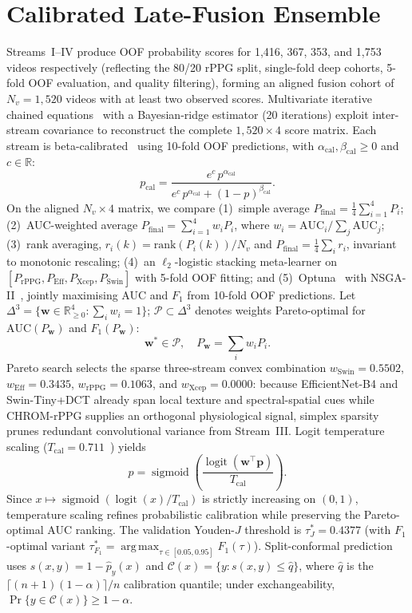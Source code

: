 \documentclass[runningheads]{llncs}
\newcommand{\R}{\mathbb{R}}
\newcommand{\bw}{\mathbf{w}}
\newcommand{\bp}{\mathbf{p}}
\newcommand{\Tcal}{T_{\mathrm{cal}}}
\DeclareMathOperator{\sigm}{sigmoid}
\DeclareMathOperator{\logit}{logit}
\DeclareMathOperator*{\argmax}{arg\,max}
\begin{document}
\section{Calibrated Late-Fusion Ensemble}
Streams~I--IV produce OOF probability scores for 1,416, 367, 353, and 1,753 videos respectively (reflecting the 80/20 rPPG split, single-fold deep cohorts, 5-fold OOF evaluation, and quality filtering), forming an aligned fusion cohort of $N_v{=}1,520$ videos with at least two observed scores. Multivariate iterative chained equations~\cite{vanbuuren2011mice} with a Bayesian-ridge estimator (20 iterations) exploit inter-stream covariance to reconstruct the complete $1,520\times 4$ score matrix. Each stream is beta-calibrated~\cite{kull2017beta} using 10-fold OOF predictions, with $\alpha_{\mathrm{cal}},\beta_{\mathrm{cal}}\ge0$ and $c\in\R$:
\begin{equation}
p_{\mathrm{cal}}=\frac{e^{c}\,p^{\alpha_{\mathrm{cal}}}}{e^{c}\,p^{\alpha_{\mathrm{cal}}}+(1-p)^{\beta_{\mathrm{cal}}}}.
\end{equation}
On the aligned $N_v\times4$ matrix, we compare (1)~simple average $P_{\mathrm{final}}=\tfrac14\sum_{i=1}^{4}P_i$; (2)~AUC-weighted average $P_{\mathrm{final}}=\sum_{i=1}^{4}w_iP_i$, where $w_i=\mathrm{AUC}_i/\sum_j\mathrm{AUC}_j$; (3)~rank averaging, $r_i(k)=\mathrm{rank}(P_i(k))/N_v$ and $P_{\mathrm{final}}=\tfrac14\sum_i r_i$, invariant to monotonic rescaling; (4)~an $\ell_2$-logistic stacking meta-learner on $[P_{\mathrm{rPPG}},P_{\mathrm{Eff}},P_{\mathrm{Xcep}},P_{\mathrm{Swin}}]$ with 5-fold OOF fitting; and (5)~Optuna~\cite{akiba2019optuna} with NSGA-II~\cite{deb2002nsga2}, jointly maximising AUC and $F_1$ from 10-fold OOF predictions. Let $\Delta^{3}=\{\bw\in\R^{4}_{\ge0}:\sum_iw_i=1\}$; $\mathcal{P}\subset\Delta^{3}$ denotes weights Pareto-optimal for $\mathrm{AUC}(P_{\bw})$ and $F_1(P_{\bw})$:
\begin{equation}
\bw^{*}\in\mathcal{P},\quad P_{\bw}=\sum_iw_iP_i.
\end{equation}
Pareto search selects the sparse three-stream convex combination $w_{\mathrm{Swin}}{=}0.5502$, $w_{\mathrm{Eff}}{=}0.3435$, $w_{\mathrm{rPPG}}{=}0.1063$, and $w_{\mathrm{Xcep}}{=}0.0000$: because EfficientNet-B4 and Swin-Tiny+DCT already span local texture and spectral-spatial cues while CHROM-rPPG supplies an orthogonal physiological signal, simplex sparsity prunes redundant convolutional variance from Stream~III. Logit temperature scaling ($\Tcal{=}0.711$~\cite{guo2017calibration}) yields
\begin{equation}
\hat p=\sigm\!\left(\frac{\logit(\bw^{\top}\bp)}{\Tcal}\right).
\end{equation}
Since $x\mapsto\sigm(\logit(x)/\Tcal)$ is strictly increasing on $(0,1)$, temperature scaling refines probabilistic calibration while preserving the Pareto-optimal AUC ranking. The validation Youden-$J$ threshold is $\tau^{*}_{J}=0.4377$ (with $F_1$-optimal variant $\tau^{*}_{F_1}=\argmax_{\tau\in[0.05,0.95]}F_1(\tau)$). Split-conformal prediction~\cite{vovk2005conformal} uses $s(x,y)=1-\hat p_y(x)$ and $\mathcal C(x)=\{y:s(x,y)\le\hat q\}$, where $\hat q$ is the $\lceil(n+1)(1-\alpha)\rceil/n$ calibration quantile; under exchangeability, $\Pr\{y\in\mathcal C(x)\}\ge1-\alpha$.
\end{document}
